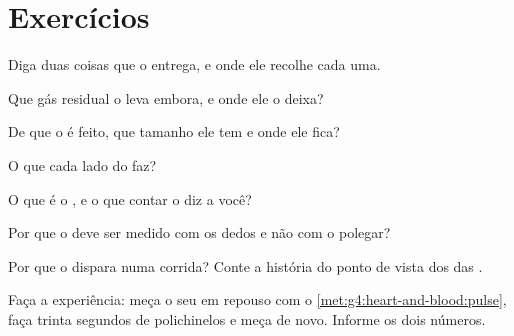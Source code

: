 \section{Exercícios}

\begin{exercise}[$\star$]\label{exo:g4:heart-and-blood:1}
Diga duas coisas que o  entrega, e onde ele recolhe cada uma.
\end{exercise}

\begin{exercise}[$\star$]\label{exo:g4:heart-and-blood:2}
Que gás residual o  leva embora, e onde ele o deixa?
\end{exercise}

\begin{exercise}[$\star$]\label{exo:g4:heart-and-blood:3}
De que o  é feito, que tamanho ele tem e onde ele fica?
\end{exercise}

\begin{exercise}[$\star$]\label{exo:g4:heart-and-blood:4}
O que cada lado do  faz?
\end{exercise}

\begin{exercise}[$\star$]\label{exo:g4:heart-and-blood:5}
O que é o , e o que contar o  diz a você?
\end{exercise}

\begin{exercise}[$\star$]\label{exo:g4:heart-and-blood:6}
Por que o  deve ser medido com os dedos e não com o polegar?
\end{exercise}

\begin{exercise}[$\star$]\label{exo:g4:heart-and-blood:7}
Por que o  dispara numa corrida? Conte a história do ponto de
vista dos  das .
\end{exercise}

\begin{exercise}[$\star$]\label{exo:g4:heart-and-blood:8}
Faça a experiência: meça o seu  em repouso com o
\cref{met:g4:heart-and-blood:pulse}, faça trinta segundos de
polichinelos e meça de novo. Informe os dois números.
\end{exercise}

